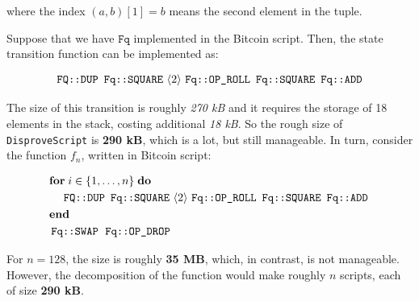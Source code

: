 \documentclass{iacrtrans}
\newcommand{\elem}[1]{\, \langle #1 \rangle \,}
\newcommand{\opcode}[1]{\, \texttt{#1} \,}
\begin{document}
where the index $(a, b)[1] = b$ means the second element in the tuple.

Suppose that we have $\mathtt{Fq}$ implemented in the Bitcoin script. Then, the state transition function can be implemented as:
\begin{empheqboxed}
  \begin{align*}
    \opcode{\texttt{FQ::DUP}} \, \opcode{\texttt{Fq::SQUARE}} \elem{2} \opcode{\texttt{Fq::OP\_ROLL}} \, \opcode{\texttt{Fq::SQUARE}} \, \opcode{\texttt{Fq::ADD}}
  \end{align*}
\end{empheqboxed}

The size of this transition is roughly \textit{270 kB} and it requires the storage of 18 elements in the stack, costing additional \textit{18 kB}. So the rough size of \texttt{DisproveScript} is \textbf{290 kB}, which is a lot, but still manageable. In turn, consider the function $f_n$, written in Bitcoin script:
\begin{empheqboxed}
  \begin{align*}
    &\textbf{for} \; i \in \{1,\dots,n\} \; \textbf{do} \\
    & \;\;\;\; \opcode{\texttt{FQ::DUP}} \, \opcode{\texttt{Fq::SQUARE}} \elem{2} \opcode{\texttt{Fq::OP\_ROLL}} \, \opcode{\texttt{Fq::SQUARE}} \, \opcode{\texttt{Fq::ADD}} \\
    & \textbf{end} \\
    & \opcode{\texttt{Fq::SWAP}} \; \opcode{\texttt{Fq::OP\_DROP}}
  \end{align*}
\end{empheqboxed}

For $n=128$, the size is roughly \textbf{35 MB}, which, in contrast, is not manageable. However, the decomposition of the function would make roughly $n$ scripts, each of size \textbf{290 kB}. 

\printbibliography{}
\end{document}

